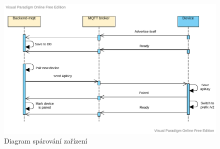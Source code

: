 \begin{figure}[htbp]
    \centering
    \includegraphics[width=\textwidth]{img/communication_part1.pdf}
    \caption{Diagram spárování zařízení}
\end{figure}
